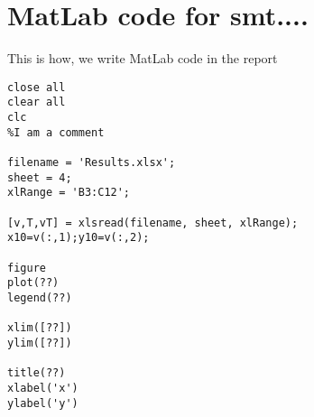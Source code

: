 \chapter{MatLab code for smt....}
\label{app:MatLabSolution}
This is how, we write MatLab code in the report
\lstset{language=Matlab}
\begin{lstlisting}
close all
clear all
clc
%I am a comment

filename = 'Results.xlsx';
sheet = 4;
xlRange = 'B3:C12';

[v,T,vT] = xlsread(filename, sheet, xlRange);
x10=v(:,1);y10=v(:,2);

figure
plot(??)
legend(??)

xlim([??])
ylim([??])

title(??)
xlabel('x')
ylabel('y')
\end{lstlisting}